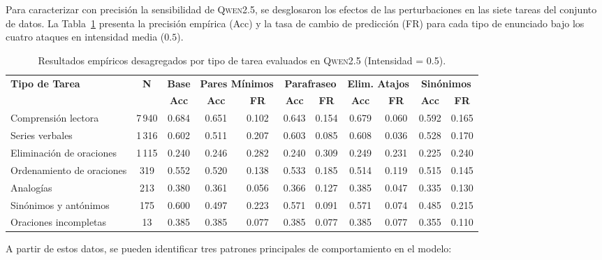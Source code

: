 \documentclass[11pt]{article}
\begin{document}
Para caracterizar con precisión la sensibilidad de \textsc{Qwen2.5}, se
desglosaron los efectos de las perturbaciones en las siete tareas del conjunto
de datos. La Tabla~\ref{tab:results-detailed} presenta la precisión empírica
(Acc) y la tasa de cambio de predicción (FR) para cada tipo de enunciado bajo
los cuatro ataques en intensidad media ($0.5$).

\begin{table}[t]
  \centering
  \small
  \caption{Resultados empíricos desagregados por tipo de tarea evaluados en \textsc{Qwen2.5} (Intensidad = 0.5).}
  \begin{tabular}{lcccccccccc}
    \toprule
    \multirow{2}{*}{\textbf{Tipo de Tarea}} & \multirow{2}{*}{\textbf{N}} & \textbf{Base} & \multicolumn{2}{c}{\textbf{Pares Mínimos}} & \multicolumn{2}{c}{\textbf{Parafraseo}} & \multicolumn{2}{c}{\textbf{Elim. Atajos}} & \multicolumn{2}{c}{\textbf{Sinónimos}} \\
    \cmidrule(lr){4-5} \cmidrule(lr){6-7} \cmidrule(lr){8-9} \cmidrule(lr){10-11}
    & & \textbf{Acc} & \textbf{Acc} & \textbf{FR} & \textbf{Acc} & \textbf{FR} & \textbf{Acc} & \textbf{FR} & \textbf{Acc} & \textbf{FR} \\
    \midrule
    Comprensión lectora & 7\,940 & 0.684 & 0.651 & 0.102 & 0.643 & 0.154 & 0.679 & 0.060 & 0.592 & 0.165 \\
    Series verbales & 1\,316 & 0.602 & 0.511 & 0.207 & 0.603 & 0.085 & 0.608 & 0.036 & 0.528 & 0.170 \\
    Eliminación de oraciones & 1\,115 & 0.240 & 0.246 & 0.282 & 0.240 & 0.309 & 0.249 & 0.231 & 0.225 & 0.240 \\
    Ordenamiento de oraciones & 319 & 0.552 & 0.520 & 0.138 & 0.533 & 0.185 & 0.514 & 0.119 & 0.515 & 0.145 \\
    Analogías & 213 & 0.380 & 0.361 & 0.056 & 0.366 & 0.127 & 0.385 & 0.047 & 0.335 & 0.130 \\
    Sinónimos y antónimos & 175 & 0.600 & 0.497 & 0.223 & 0.571 & 0.091 & 0.571 & 0.074 & 0.485 & 0.215 \\
    Oraciones incompletas & 13 & 0.385 & 0.385 & 0.077 & 0.385 & 0.077 & 0.385 & 0.077 & 0.355 & 0.110 \\
    \bottomrule
  \end{tabular}
  \label{tab:results-detailed}
\end{table}

A partir de estos datos, se pueden identificar tres patrones principales de
comportamiento en el modelo:
\end{document}
